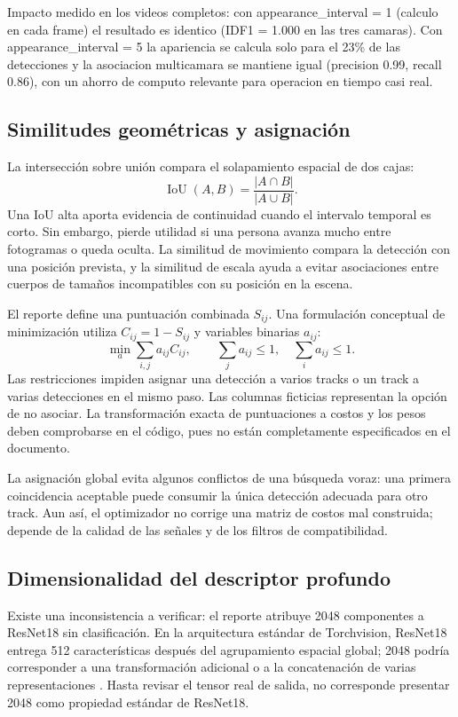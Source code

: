 \documentclass[12pt,letterpaper]{article}
\begin{document}
Impacto medido en los videos completos: con appearance\_\allowbreak interval = 1 (calculo en cada frame) el resultado es identico (IDF1 = 1.000 en las tres camaras). Con appearance\_\allowbreak interval = 5 la apariencia se calcula solo para el 23\% de las detecciones y la asociacion multicamara se mantiene igual (precision 0.99, recall 0.86), con un ahorro de computo relevante para operacion en tiempo casi real.


\subsection{Similitudes geométricas y asignación}
La intersección sobre unión compara el solapamiento espacial de dos cajas:
\begin{equation}
 \operatorname{IoU}(A,B)=\frac{|A\cap B|}{|A\cup B|}.
\end{equation}
Una IoU alta aporta evidencia de continuidad cuando el intervalo temporal es corto. Sin embargo, pierde utilidad si una persona avanza mucho entre fotogramas o queda oculta. La similitud de movimiento compara la detección con una posición prevista, y la similitud de escala ayuda a evitar asociaciones entre cuerpos de tamaños incompatibles con su posición en la escena.

El reporte define una puntuación combinada $S_{ij}$. Una formulación conceptual de minimización utiliza $C_{ij}=1-S_{ij}$ y variables binarias $a_{ij}$:
\begin{equation}
 \min_a\sum_{i,j}a_{ij}C_{ij},\qquad
 \sum_j a_{ij}\leq 1,\quad \sum_i a_{ij}\leq 1.
\end{equation}
Las restricciones impiden asignar una detección a varios tracks o un track a varias detecciones en el mismo paso. Las columnas ficticias representan la opción de no asociar. La transformación exacta de puntuaciones a costos y los pesos deben comprobarse en el código, pues no están completamente especificados en el documento.

La asignación global evita algunos conflictos de una búsqueda voraz: una primera coincidencia aceptable puede consumir la única detección adecuada para otro track. Aun así, el optimizador no corrige una matriz de costos mal construida; depende de la calidad de las señales y de los filtros de compatibilidad.

\subsection{Dimensionalidad del descriptor profundo}
Existe una inconsistencia a verificar: el reporte atribuye 2048 componentes a ResNet18 sin clasificación. En la arquitectura estándar de Torchvision, ResNet18 entrega 512 características después del agrupamiento espacial global; 2048 podría corresponder a una transformación adicional o a la concatenación de varias representaciones \cite{resnet}. Hasta revisar el tensor real de salida, no corresponde presentar 2048 como propiedad estándar de ResNet18.
\end{document}
